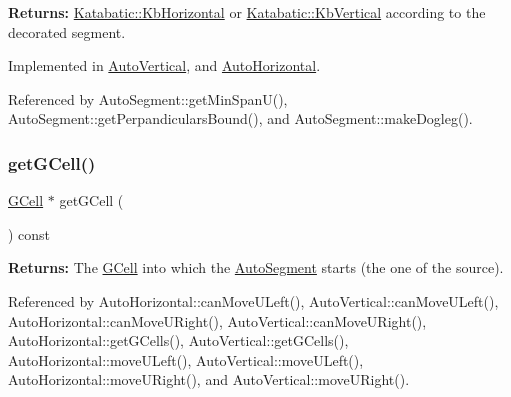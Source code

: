 {\bfseries Returns\+:} \mbox{\hyperlink{namespaceKatabatic_a2af2ad6b6441614038caf59d04b3b217a1a9045673c5d3c30b067100f1440ae1b}{Katabatic\+::\+Kb\+Horizontal}} or \mbox{\hyperlink{namespaceKatabatic_a2af2ad6b6441614038caf59d04b3b217a284cad95203a27172838b09e396e3590}{Katabatic\+::\+Kb\+Vertical}} according to the decorated segment. 

Implemented in \mbox{\hyperlink{classKatabatic_1_1AutoVertical_a0dd7cf705ace42c662c289955313b2e9}{Auto\+Vertical}}, and \mbox{\hyperlink{classKatabatic_1_1AutoHorizontal_a0dd7cf705ace42c662c289955313b2e9}{Auto\+Horizontal}}.



Referenced by Auto\+Segment\+::get\+Min\+Span\+U(), Auto\+Segment\+::get\+Perpandiculars\+Bound(), and Auto\+Segment\+::make\+Dogleg().

\mbox{\label{classKatabatic_1_1AutoSegment_a819cf639562a031a1e2e061fe1293d66}} 
\subsubsection{\texorpdfstring{get\+G\+Cell()}{getGCell()}}
{\footnotesize\ttfamily \mbox{\hyperlink{classKatabatic_1_1GCell}{G\+Cell}} $\ast$ get\+G\+Cell (\begin{DoxyParamCaption}{ }\end{DoxyParamCaption}) const\hspace{0.3cm}{\ttfamily [inline]}}

{\bfseries Returns\+:} The \mbox{\hyperlink{classKatabatic_1_1GCell}{G\+Cell}} into which the \mbox{\hyperlink{classKatabatic_1_1AutoSegment}{Auto\+Segment}} starts (the one of the source). 

Referenced by Auto\+Horizontal\+::can\+Move\+U\+Left(), Auto\+Vertical\+::can\+Move\+U\+Left(), Auto\+Horizontal\+::can\+Move\+U\+Right(), Auto\+Vertical\+::can\+Move\+U\+Right(), Auto\+Horizontal\+::get\+G\+Cells(), Auto\+Vertical\+::get\+G\+Cells(), Auto\+Horizontal\+::move\+U\+Left(), Auto\+Vertical\+::move\+U\+Left(), Auto\+Horizontal\+::move\+U\+Right(), and Auto\+Vertical\+::move\+U\+Right().

\mbox{\label{classKatabatic_1_1AutoSegment_a8ca0022e253d355817d46a057ae01625}} 
